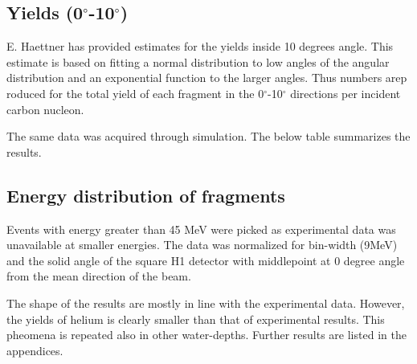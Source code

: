 \subsection{Yields (0$^\circ$-10$^\circ$)}
E. Haettner has provided estimates for the yields inside 10 degrees angle. This estimate is based on fitting a normal distribution to low angles of the angular distribution and an exponential function to the larger angles. Thus numbers arep roduced for the total yield of each fragment in the 0$^\circ$-10$^\circ$ directions per incident carbon nucleon.

The same data was acquired through simulation. The below table summarizes the results.



\subsection{Energy distribution of fragments}
Events with energy greater than 45 MeV were picked as experimental data was unavailable at smaller energies. The data was normalized for bin-width (9MeV) and the solid angle of the square H1 detector with middlepoint at 0 degree angle from the mean direction of the beam.

The shape of the results are mostly in line with the experimental data. However, the yields of helium is clearly smaller than that of experimental results. This pheomena is repeated also in other water-depths. Further results are listed in the appendices.

